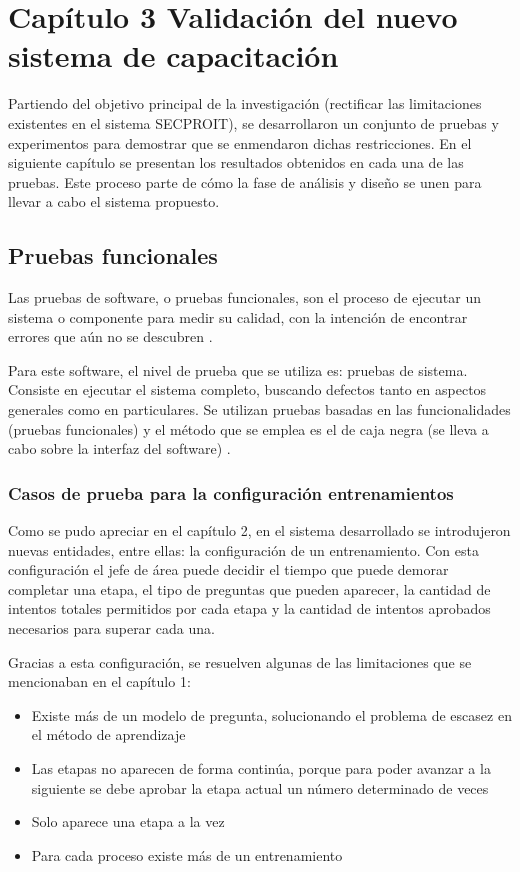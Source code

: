 \chapter*{Capítulo 3 \vspace{0.5cm} \break Validación del nuevo sistema de capacitación}
\setcounter{chapter}{3}
\setcounter{section}{0}

Partiendo del objetivo principal de la investigación (rectificar las limitaciones existentes en el sistema SECPROIT), se desarrollaron un conjunto de pruebas y experimentos para demostrar que se enmendaron dichas restricciones. En el siguiente capítulo se presentan los resultados obtenidos en cada una de las pruebas. Este proceso parte de cómo la fase de análisis y diseño se unen para llevar a cabo el sistema propuesto.

\section{Pruebas funcionales}
 Las pruebas de software, o pruebas funcionales, son el proceso de ejecutar un sistema o componente para medir su calidad, con la intención de encontrar errores que aún no se descubren \cite{Buehler2008}.

Para este software, el nivel de prueba que se utiliza es: pruebas de sistema. Consiste en ejecutar el sistema completo, buscando defectos tanto en aspectos generales como en particulares. Se utilizan pruebas basadas en las funcionalidades (pruebas funcionales) y el método que se emplea es el de caja negra (se lleva a cabo sobre la interfaz del software) \cite{Nidhra2012}.

\subsection{Casos de prueba para la configuración entrenamientos}
Como se pudo apreciar en el capítulo 2, en el sistema desarrollado se introdujeron nuevas entidades, entre ellas: la configuración de un entrenamiento. Con esta configuración el jefe de área puede decidir el tiempo que puede demorar completar una etapa, el tipo de preguntas que pueden aparecer, la cantidad de intentos totales permitidos por cada etapa y la cantidad de intentos aprobados necesarios para superar cada una.

Gracias a esta configuración, se resuelven algunas de las limitaciones que se mencionaban en el capítulo 1: 
\begin{itemize}
\item Existe más de un modelo de pregunta, solucionando el problema de escasez en el método de aprendizaje
\item Las etapas no aparecen de forma continúa, porque para poder avanzar a la siguiente se debe aprobar la etapa actual un número determinado de veces
\item Solo aparece una etapa a la vez
\item Para cada proceso existe más de un entrenamiento
\end{itemize}

